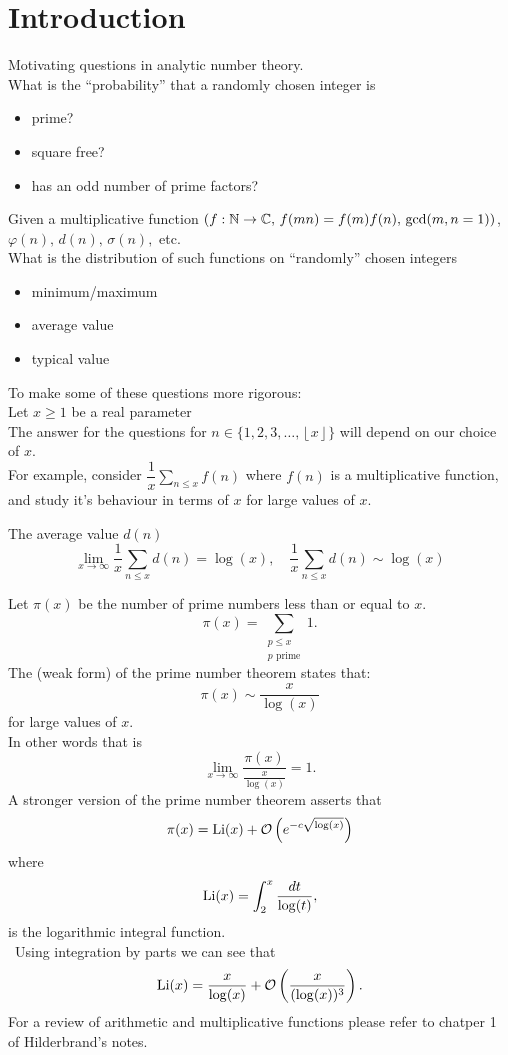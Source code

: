 \documentclass[twoside, openright, fontsize=10pt, headings=big]{scrbook}
\begin{document}
\let\cleardoublepage\clearpage


\frontmatter
\tableofcontents
\mainmatter

\chapter{Introduction}
Motivating questions in analytic number theory.\\
What is the ``probability'' that a randomly chosen integer is 
\begin{itemize}
    \item prime?
    \item square free?
    \item has an odd number of prime factors?
\end{itemize}
Given a multiplicative function $(f:\mathbb{N}\to\mathbb{C},\,f(mn)=f(m)f(n),\,\gcd(m,n=1))$, $\varphi(n),\,d(n),\,\sigma(n),$ etc.\\
What is the distribution of such functions on ``randomly'' chosen integers
\begin{itemize}
    \item minimum/maximum
    \item average value
    \item typical value
\end{itemize}
To make some of these questions more rigorous:\\
Let $x\geq 1$ be a real parameter\\
The answer for the questions for $n\in\{1,2,3,\dots,\left\lfloor x\right\rfloor \}$ will depend on our choice of $x$.\\
For example, consider $\dfrac{1}{x}\sum_{n\leq x}f(n)$ where $f(n)$ is a multiplicative function, and study it's behaviour in terms of $x$ for large values of $x$.
\begin{example}{}{}
    The average value $d(n)$
\[
    \lim_{x\to\infty}\frac{1}{x}\sum_{n\leq x}d(n)=\log(x), \quad \frac{1}{x}\sum_{n\leq x}d(n)\sim\log(x) 
\]
\end{example}
Let $\pi(x)$ be the number of prime numbers less than or equal to $x$.
\[
    \pi(x)=\sum_{\substack{p\leq x\\ p\text{ prime}}}1.
\]
The (weak form) of the prime number theorem states that:
\[
    \pi(x)\sim\frac{x}{\log(x)}
\]
for large values of $x$.\\
In other words that is 
\[
    \lim_{x\to\infty}\frac{\pi(x)}{\frac{x}{\log(x)}}=1.
\]
A stronger version of the prime number theorem asserts that 
\[
    \pi(x)=\operatorname{Li}(x)+\mathcal{O}\left(e^{-c\sqrt{\log(x)}}\right)
\]
where
\[
    \operatorname{Li}(x)=\int_{2}^{x}\frac{dt}{\log(t)},
\]
is the logarithmic integral function.\\\
Using integration by parts we can see that 
\[
    \operatorname{Li}(x)=\frac{x}{\log(x)}+\mathcal{O}\left(\frac{x}{(\log(x))^3}\right).
\]
For a review of arithmetic and multiplicative functions please refer to chatper 1 of Hilderbrand's notes.\\
\setcounter{section}{1}
\end{document}
